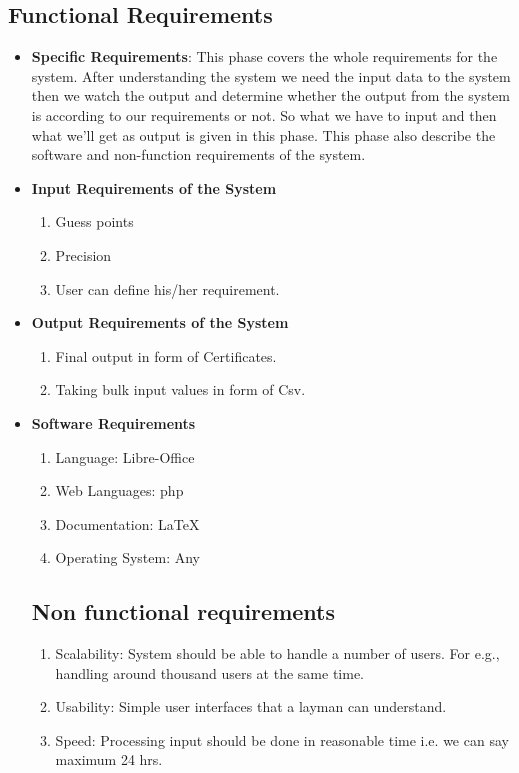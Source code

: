 \subsection{Functional Requirements}
\begin{itemize}
\item {\bf Specific Requirements}: This phase covers the whole requirements 
for the system. After understanding the system we need the input data 
to the system then we watch the output and determine whether the output 
from the system is according to our requirements or not. So what we have 
to input and then what we'll get as output is given in this phase. This 
phase also describe the software and non-function requirements of the 
system.
\item {\bf Input Requirements of the System}
\begin{enumerate} 
\item Guess points
\item Precision
\item User can define his/her requirement.
\end{enumerate}
\vskip 0.5cm
\item {\bf Output Requirements of the System}
\begin{enumerate} 
\item Final output in form of Certificates. 
\item Taking bulk input values in form of Csv.
\end{enumerate}
\vskip 0.5cm
\item {\bf Software Requirements}
\begin{enumerate} 
\item Language: Libre-Office
\item Web Languages: php
\item Documentation: \LaTeX{}
\item Operating System: Any

\end{enumerate}
\vskip 0.5cm
\subsection{Non functional requirements}
\begin{enumerate} 
\item Scalability: System should be able to handle a number of users. 
For e.g., handling around thousand users at the same time.
\item Usability: Simple user interfaces that a layman can understand.
\item Speed: Processing input should be done in reasonable time
 i.e. we can say maximum 24 hrs.
\end{enumerate}


\end{itemize}
